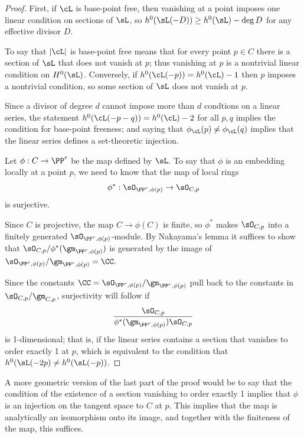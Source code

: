 \begin{proof}
First, if $\cL$ is base-point free, then vanishing at a point imposes one linear condition on sections of $\sL$, so 
$h^0(\sL(-D)) \geq h^0(\sL)-\deg D$ for any
effective divisor $D$.

To say that $|\cL|$ is base-point free means that for every point $p\in C$ there is a section of $\sL$ that does not vanish at $p$; thus vanishing
at $p$ is a nontrivial linear condition on $H^0(\sL)$. Conversely, if $h^0(\cL(-p)) = h^0(\cL) - 1$ then $p$ imposes a nontrivial condition, so
some section of $\sL$ does not vanish at $p$.

Since a divisor of degree $d$ cannot impose more than $d$ condtions on a linear series, the statement $h^0(\cL(-p-q)) = h^0(\cL) - 2$ for all $p, q$ implies the condition for base-point freeness; and saying that $\phi_\cL(p) \neq \phi_\cL(q)$ implies that the linear series defines a set-theoretic injection. 


Let $\phi:C \to \PP^r$ be the map defined by $\sL$. To say that $\phi$  is an embedding locally at a point $p$, we need to know that the map of local rings
$$
\phi^*: \sO_{\PP^r,\phi(p)} \to \sO_{C,p} 
$$
is surjective. 

Since $C$ is projective, the map $C\to \phi(C)$ is finite,
so $\phi^*$ makes $\sO_{C,p}$ into a finitely generated $\sO_{\PP^r,\phi(p)}$-module.
By Nakayama's lemma it suffices to show that 
$\sO_{C,p}/\phi^*(\gm_{\PP^r,\phi(p)})$
is generated by the image of $\sO_{\PP^r,\phi(p)}/\gm_{\PP^r,\phi(p)} = \CC.$

 Since the constants  $\CC =\sO_{\PP^r,\phi(p)}/\gm_{\PP^r,\phi(p)}$ pull back to the constants in
$\sO_{C,p}/\gm_{C,p}$,
surjectivity will follow if 
$$
\frac{\sO_{C,p}}
{\phi^*(\gm_{\PP^r,\phi(p)})  \sO_{C,p}}
$$
is 1-dimensional; that is, if the linear series contains
a section that vanishes to order exactly 1 at $p$, which is equivalent to the condition
that $h^0(\sL(-2p) \neq h^0(\sL(-p))$.
\end{proof}

A more geometric version of the last part of the proof would be to say that the condition of the existence of a section
vanishing to order exactly 1 implies that $\phi$ is an injection on the tangent space to $C$ at $p$. This implies that
the map is analytically an isomorphism onto its image, and together with the finiteness of the map, this suffices.

